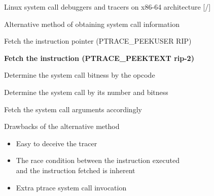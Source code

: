 \documentclass[unicode,aspectratio=169,xcolor={table,dvipsnames,usernames}]{beamer}
\begin{document}
\begin{frame}{Linux system call debuggers and tracers on x86-64 architecture \hfill [\insertframenumber/\inserttotalframenumber]}
\large
\begin{block}{Alternative method of obtaining system call information}
\begin{itemize}
	\item Fetch the instruction pointer (PTRACE\_PEEKUSER RIP)
	\item {\bf Fetch the instruction (PTRACE\_PEEKTEXT rip-2)
	\item Determine the system call bitness by the opcode}
	\item Determine the system call by its number and bitness
	\item Fetch the system call arguments accordingly
\end{itemize}
\end{block}

\begin{block}{Drawbacks of the alternative method}
\begin{itemize}
	\item Easy to deceive the tracer
	\item The race condition between the instruction executed \\
		and the instruction fetched is inherent
	\item Extra ptrace system call invocation
\end{itemize}
\end{block}
\end{frame}
\end{document}
